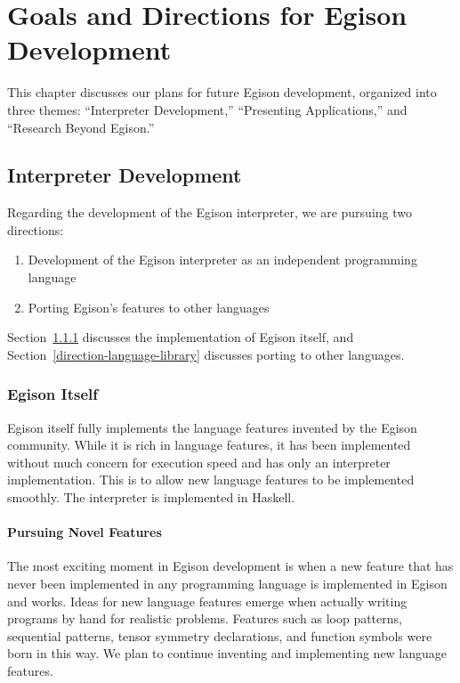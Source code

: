 \chapter{Goals and Directions for Egison Development}\label{direction}

This chapter discusses our plans for future Egison development, organized into three themes: ``Interpreter Development,'' ``Presenting Applications,'' and ``Research Beyond Egison.''

\section{Interpreter Development}\label{direction-language}

Regarding the development of the Egison interpreter, we are pursuing two directions:
\begin{enumerate}
\item Development of the Egison interpreter as an independent programming language
\item Porting Egison's features to other languages
\end{enumerate}
Section~\ref{direction-language-egison} discusses the implementation of Egison itself, and Section~\ref{direction-language-library} discusses porting to other languages.

\subsection{Egison Itself}\label{direction-language-egison}

Egison itself fully implements the language features invented by the Egison community.
While it is rich in language features, it has been implemented without much concern for execution speed and has only an interpreter implementation.
This is to allow new language features to be implemented smoothly.
The interpreter is implemented in Haskell.

\subsubsection{Pursuing Novel Features}\label{direction-language-egison-new}

The most exciting moment in Egison development is when a new feature that has never been implemented in any programming language is implemented in Egison and works.
Ideas for new language features emerge when actually writing programs by hand for realistic problems.
Features such as loop patterns, sequential patterns, tensor symmetry declarations, and function symbols were born in this way.
We plan to continue inventing and implementing new language features.

